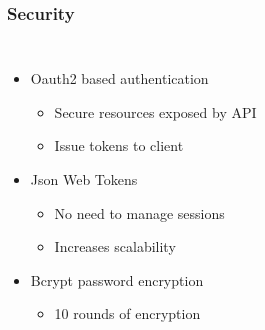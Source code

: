 \documentclass{beamer}
\begin{document}
\begin{frame}
    \frametitle{Security}
    \begin{columns}
        \begin{itemize}
            \pause
            \item Oauth2 based authentication
            \begin{itemize}
                \item Secure resources exposed by API
                \item Issue tokens to client
            \end{itemize}

            \pause
            \vspace{.2cm}
            \item Json Web Tokens
            \begin{itemize}
                \item No need to manage sessions
                \item Increases scalability
            \end{itemize}

            \pause
            \vspace{.2cm}
            \item Bcrypt password encryption
            \begin{itemize}
                \item 10 rounds of encryption
            \end{itemize}
        \end{itemize}


\end{columns}
\end{frame}
\end{document}
